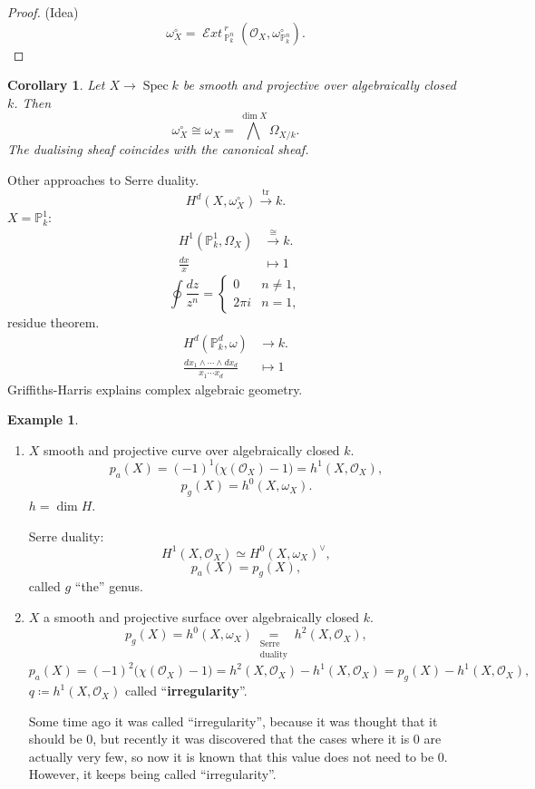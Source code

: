 \documentclass[12pt]{article}
\DeclareMathOperator{\Spec}{Spec}
\DeclareMathOperator{\shExt}{\mathcal E\textit{xt}\,}
\DeclareMathOperator{\tr}{tr}
\newtheorem*{corollary}{Corollary}
\theoremstyle{definition}
\newtheorem*{example}{Example}
\begin{document}
\begin{proof}
(Idea)
\[\omega_X^\circ=\shExt_{\mathbb P_k^n}^r(\mathcal O_X,\omega_{\mathbb P_k^n}^\circ).\]
\end{proof}

\begin{corollary}
Let $X\rightarrow\Spec k$ be smooth and projective over algebraically closed $k$. Then
\[\omega_X^\circ\cong\omega_X={\bigwedge}^{\dim X}\Omega_{X/k}.\]
The dualising sheaf coincides with the canonical sheaf.
\end{corollary}

Other approaches to Serre duality.
\[H^d(X,\omega_X^\circ)\overset{\tr}\longrightarrow k.\]
$X=\mathbb P_k^1$:
\begin{align*}
H^1(\mathbb P_k^1,\Omega_X)&\overset\cong\longrightarrow k.\\\frac{dx}x&\longmapsto1
\end{align*}
\[\oint\frac{dz}{z^n}=\left\{\begin{array}{ll}0&n\neq1,\\2\pi i&n=1,\end{array}\right.\]
residue theorem.
\begin{align*}
H^d(\mathbb P_k^d,\omega)&\longrightarrow k.\\\frac{dx_1\wedge\cdots\wedge dx_d}{x_1\cdots x_d}&\longmapsto1
\end{align*}
Griffiths-Harris \cite{griffiths2014principles} explains complex algebraic geometry.

\begin{example}
\begin{enumerate}[label=\arabic*)]
\item $X$ smooth and projective curve over algebraically closed $k$.
\[p_a(X)=(-1)^1\big(\chi(\mathcal O_X)-1\big)=h^1(X,\mathcal O_X),\]
\[p_g(X)=h^0(X,\omega_X).\]
$h=\dim H$.

Serre duality:
\[H^1(X,\mathcal O_X)\simeq H^0(X,\omega_X)^\vee,\]
\[p_a(X)=p_g(X),\]
called $g$ ``the'' genus.

\item $X$ a smooth and projective surface over algebraically closed $k$.
\[p_g(X)=h^0(X,\omega_X)\underset{\substack{\text{Serre}\\\text{duality}}}=h^2(X,\mathcal O_X),\]
\[p_a(X)=(-1)^2\big(\chi(\mathcal O_X)-1\big)=h^2(X,\mathcal O_X)-h^1(X,\mathcal O_X)=p_g(X)-h^1(X,\mathcal O_X),\]
$q\coloneqq h^1(X,\mathcal O_X)$ called ``\textbf{irregularity}''.

Some time ago it was called ``irregularity'', because it was thought that it should be $0$, but recently it was discovered that the cases where it is $0$ are actually very few, so now it is known that this value does not need to be $0$. However, it keeps being called ``irregularity''.
\end{enumerate}
\end{example}
\end{document}
